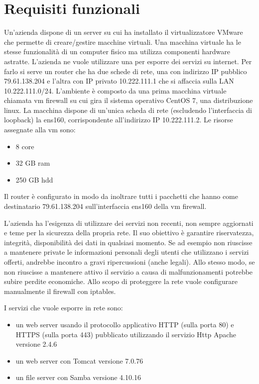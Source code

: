 \section{Requisiti funzionali}

Un'azienda dispone di un server su cui ha installato il virtualizzatore VMware che permette di creare/gestire macchine virtuali. Una macchina virtuale ha le stesse funzionalità di un computer fisico ma utilizza componenti hardware astratte. L'azienda ne vuole utilizzare una per esporre dei servizi su internet. Per farlo si serve un router che ha due schede di rete, una con indirizzo IP pubblico 79.61.138.204 e l'altra con IP privato 10.222.111.1 che si affaccia sulla LAN 10.222.111.0/24.
L'ambiente è composto da una prima macchina virtuale chiamata vm firewall su cui gira il sistema operativo CentOS 7, una distribuzione linux. La macchina dispone di un'unica scheda di rete (escludendo l'interfaccia di loopback) la ens160, corrispondente all'indirizzo IP 10.222.111.2.
Le risorse assegnate alla vm sono:
\begin{itemize}
    \item  8 core
    \item  32 GB ram
    \item 250 GB hdd
\end{itemize}

Il router è configurato in modo da inoltrare tutti i pacchetti che hanno come destinatario 79.61.138.204 sull'interfaccia ens160 della vm firewall.

L'azienda ha l'esigenza di utilizzare dei servizi non recenti, non sempre aggiornati e teme per la sicurezza della propria rete. Il suo obiettivo è garantire riservatezza, integrità, disponibilità dei dati in qualsiasi momento. Se ad esempio non riuscisse a mantenere private le informazioni personali degli utenti che utilizzano i servizi offerti, andrebbe incontro a gravi ripercussioni (anche legali). Allo stesso modo, se non riuscisse a mantenere attivo il servizio a causa di malfunzionamenti potrebbe subire perdite economiche. Allo scopo di proteggere la rete vuole configurare manualmente il firewall con iptables.

I servizi che vuole esporre in rete sono:
\begin{itemize}
    \item  un web server usando il protocollo applicativo HTTP (sulla porta 80) e HTTPS (sulla porta 443) pubblicato utilizzando il servizio Http Apache versione 2.4.6
    \item un web server con Tomcat versione 7.0.76
    \item un file server con Samba versione 4.10.16
\end{itemize}

